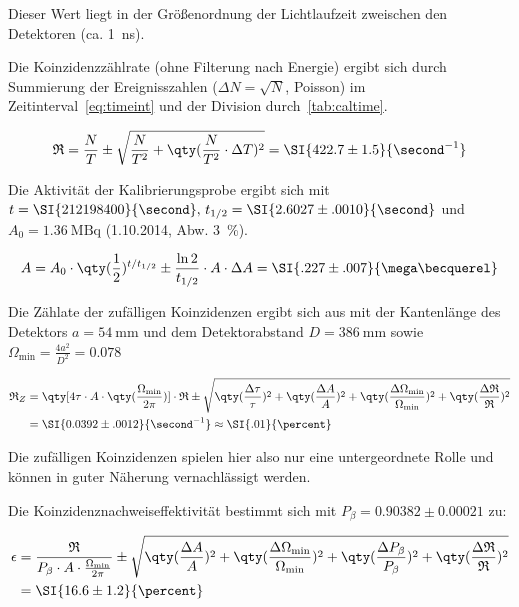 \documentclass[slug=PET, room=Andreas-Schubert-Bau\,\ 424A, supervisor=Carsten\ Bittrich, coursedate=10.\ 01.\ 2020]{../../Lab_Report_LaTeX/lab_report}
\begin{document}
Dieser Wert liegt in der Gr\"o\ss{}enordnung der Lichtlaufzeit
zweischen den Detektoren (ca. \SI{1}{\nano\second}).

Die Koinzidenzz\"ahlrate (ohne Filterung nach Energie) ergibt sich
durch Summierung der Ereignisszahlen (\(\Delta N = \sqrt{N}\),
Poisson) im Zeitinterval~\eqref{eq:timeint} und der Division
durch~\eqref{tab:caltime}.

\begin{equation}
  \label{eq:ctrate}
  \mathfrak{R} = \frac{N}{T} \pm \sqrt{\frac{N}{T^2} +
    \qty(\frac{N}{T^2}\cdot \Delta T)^2} = \SI{422.7\pm 1.5}{\second^{-1}}
\end{equation}

Die Aktivität der  Kalibrierungsprobe ergibt sich mit
\(t=\SI{212198400}{\second},\, t_{1/2} = \SI{2.6027\pm .0010}{\second}\) und \(A_0
= \SI{1.36}{\mega\becquerel}\) (1.10.2014, Abw. \SI{3}{\percent}).

\begin{equation}
  \label{eq:acttoday}
  A = A_0\cdot \qty(\frac{1}{2})^{t/t_{1/2}} \pm
  \frac{\ln{2}}{t_{1/2}}\cdot A\cdot\Delta A = \SI{.227\pm.007}{\mega\becquerel}
\end{equation}

Die Z\"ahlate der zuf\"alligen Koinzidenzen ergibt sich aus
 mit der Kantenl\"ange des Detektors
\(a=\SI{54}{\milli\meter}\) und dem Detektorabstand
\(D=\SI{386}{\milli\meter}\) sowie
\(\Omega_{\min} = \frac{4a^2}{D^2} = 0.078\)

\begin{align}
  \label{eq:incidentalrate}
  \mathfrak{R}_Z &= \qty[4\tau\cdot A\cdot
  \qty(\frac{\Omega_{\min}}{2\pi})]\cdot \mathfrak{R} \pm
  \sqrt{\qty(\frac{\Delta\tau}{\tau})^2 + \qty(\frac{\Delta A}{A})^2 +
    \qty(\frac{\Delta\Omega_{\min}}{\Omega_{\min}})^2 +
                   \qty(\frac{\Delta\mathfrak{R}}{\mathfrak{R}})^2} \\
                 &= \SI{0.0392\pm .0012}{\second^{-1}} \approx \SI{.01}{\percent}
\end{align}

Die zuf\"alligen Koinzidenzen spielen hier also nur eine
untergeordnete Rolle und k\"onnen in guter N\"aherung vernachl\"assigt
werden.

Die Koinzidenznachweiseffektivit\"at bestimmt sich
 mit \(P_\beta = 0.90382\pm 0.00021\) zu:

\begin{align}
  \epsilon & = \frac{\mathfrak{R}}{P_\beta\cdot A \cdot
  \frac{\Omega_{\min}}{2\pi}} \pm \sqrt{\qty(\frac{\Delta A}{A})^2 +
  \qty(\frac{\Delta\Omega_{\min}}{\Omega_{\min}})^2 +
  \qty(\frac{\Delta P_\beta}{P_\beta})^2 +
             \qty(\frac{\Delta\mathfrak{R}}{\mathfrak{R}})^2} \\
  & = \SI{16.6\pm 1.2}{\percent}
\end{align}
\end{document}
